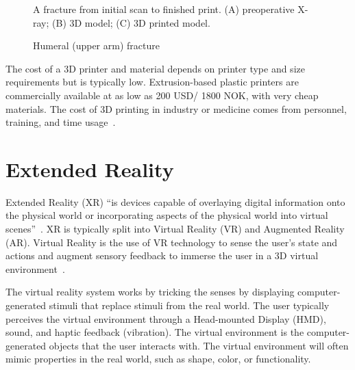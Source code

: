 \documentclass[a4paper]{report}
\begin{document}
\begin{figure}[h!]
    \centering
	\hfill
  \caption{Humeral (upper arm) fracture}
  \label{3dprint}
  \small
    A fracture from initial scan to finished print. (A) preoperative X-ray; (B) 3D model; (C) 3D printed model.
\end{figure}

The cost of a 3D printer and material depends on printer type and size requirements but is typically low. Extrusion-based plastic printers are commercially available at as low as 200 USD/ 1800 NOK, with very cheap materials. The cost of 3D printing in industry or medicine comes from personnel, training, and time usage~\cite{shahrubudin_overview_2019}.

\section{Extended Reality}

Extended Reality (XR) \enquote{is devices capable of overlaying digital information onto the physical world or incorporating aspects of the physical world into virtual scenes}~\cite{andrews_extended_2019}.
XR is typically split into Virtual Reality (VR) and Augmented Reality (AR).
Virtual Reality is the use of VR technology to sense the user's state and actions and augment sensory feedback to immerse the user in a 3D virtual environment~\cite{mihelj_virtual_2014}.

The virtual reality system works by tricking the senses by displaying computer-generated stimuli that replace stimuli from the real world. 
The user typically perceives the virtual environment through a Head-mounted Display (HMD), sound, and haptic feedback (vibration).
The virtual environment is the computer-generated objects that the user interacts with. The virtual environment will often mimic properties in the real world, such as shape, color, or functionality.
\end{document}
